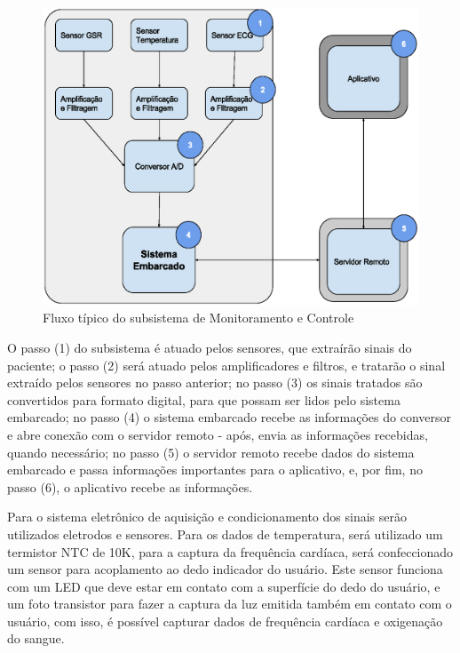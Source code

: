 \begin{figure}[H]
  \centering
    \includegraphics[width=\textwidth]{figuras/arquitetura-monitoramentoecontrole.eps}
  \caption{Fluxo típico do subsistema de Monitoramento e Controle}
  \label{fig:arquitetura-monitoramento-e-controle}
\end{figure}

O passo (1) do subsistema é atuado pelos sensores, que extraírão sinais do paciente;
o passo (2) será atuado pelos amplificadores e filtros, e tratarão o sinal
extraído pelos sensores no passo anterior; no passo (3) os sinais tratados
são convertidos para formato digital, para que possam ser lidos pelo sistema
embarcado; no passo (4) o sistema embarcado recebe as informações do conversor
e abre conexão com o servidor remoto - após, envia as informações recebidas,
quando necessário; no passo (5) o servidor remoto recebe dados do sistema
embarcado e passa informações importantes para o aplicativo, e, por fim,
no passo (6), o aplicativo recebe as informações.

Para o sistema eletrônico de aquisição e condicionamento dos sinais serão 
utilizados eletrodos e sensores. Para os dados de temperatura, será utilizado 
um termistor NTC de 10K, para a captura da frequência cardíaca, será confeccionado 
um sensor para acoplamento ao dedo indicador do usuário. Este sensor funciona 
com um LED que deve estar em contato com a superfície do dedo do usuário, 
e um foto transistor para fazer a captura da luz emitida também em contato 
com o usuário, com isso, é possível capturar dados de frequência cardíaca e oxigenação do sangue.

